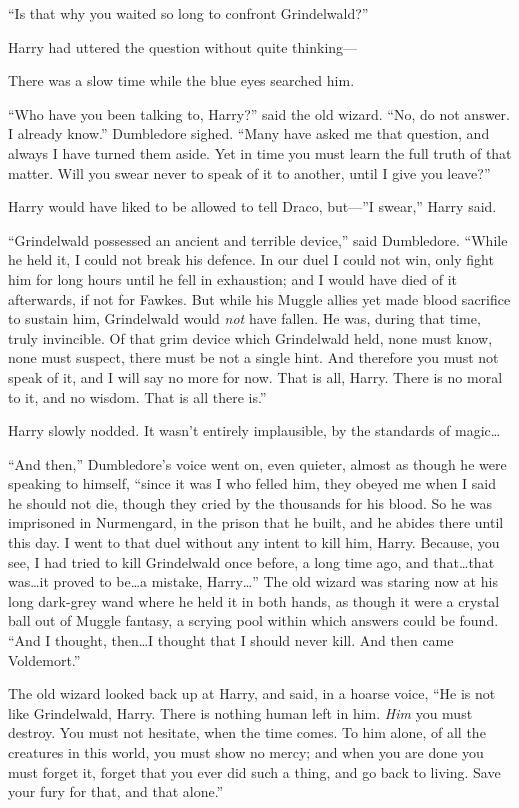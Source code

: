 “Is that why you waited so long to confront Grindelwald?”

Harry had uttered the question without quite thinking—

There was a slow time while the blue eyes searched him.

“Who have you been talking to, Harry?” said the old wizard. “No, do not answer. I already know.” Dumbledore sighed. “Many have asked me that question, and always I have turned them aside. Yet in time you must learn the full truth of that matter. Will you swear never to speak of it to another, until I give you leave?”

Harry would have liked to be allowed to tell Draco, but—”I swear,” Harry said.

“Grindelwald possessed an ancient and terrible device,” said Dumbledore. “While he held it, I could not break his defence. In our duel I could not win, only fight him for long hours until he fell in exhaustion; and I would have died of it afterwards, if not for Fawkes. But while his Muggle allies yet made blood sacrifice to sustain him, Grindelwald would \emph{not} have fallen. He was, during that time, truly invincible. Of that grim device which Grindelwald held, none must know, none must suspect, there must be not a single hint. And therefore you must not speak of it, and I will say no more for now. That is all, Harry. There is no moral to it, and no wisdom. That is all there is.”

Harry slowly nodded. It wasn’t entirely implausible, by the standards of magic…

“And then,” Dumbledore’s voice went on, even quieter, almost as though he were speaking to himself, “since it was I who felled him, they obeyed me when I said he should not die, though they cried by the thousands for his blood. So he was imprisoned in Nurmengard, in the prison that he built, and he abides there until this day. I went to that duel without any intent to kill him, Harry. Because, you see, I had tried to kill Grindelwald once before, a long time ago, and that…that was…it proved to be…a mistake, Harry…” The old wizard was staring now at his long dark-grey wand where he held it in both hands, as though it were a crystal ball out of Muggle fantasy, a scrying pool within which answers could be found. “And I thought, then…I thought that I should never kill. And then came Voldemort.”

The old wizard looked back up at Harry, and said, in a hoarse voice, “He is not like Grindelwald, Harry. There is nothing human left in him. \emph{Him} you must destroy. You must not hesitate, when the time comes. To him alone, of all the creatures in this world, you must show no mercy; and when you are done you must forget it, forget that you ever did such a thing, and go back to living. Save your fury for that, and that alone.”

